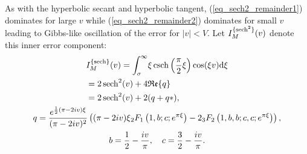 As with the hyperbolic secant and hyperbolic tangent, (\ref{eq_sech2_remainder1})
dominates for large $v$ while (\ref{eq_sech2_remainder2})
dominates for small $v$ leading to Gibbs-like oscillation of the
error for $|v| < V$.  Let $I_M^{\{\operatorname{sech}^2\}}(v)$ denote this inner
error component:
\begin{gather}
	\begin{split}
		\label{eq_lerch_error_part_sech2}
		&I_M^{\{\operatorname{sech}\}}(v) = \int_\sigma^{\infty} \!
		\xi\operatorname{csch}\left(\frac{\pi}{2}\xi\right)
		\cos(\xi v) \mathrm{d}\xi \\
		&= 2 \operatorname{sech}^2(v) + 4\mathfrak{Re}\{q\} \\
		&= 2 \operatorname{sech}^2(v) + 2(q + q*),
	\end{split}
    \\
    \begin{split}
    	q = \frac{e^{\frac{1}{2}(\pi-2iv)\xi}}{(\pi - 2iv)^2}
    	    \left(
    	        (\pi-2iv)\xi {}_{2}F_{1}\left(
    	                1, b; c; e^{\pi\xi}
    	        \right)
    	        - 2 {}_{3}F_{2}\left(
    	                1, b, b; c, c; e^{\pi\xi}
    	        \right)
    	    \right), \\
    \end{split}
    \\
    \begin{split}
    	b = \frac{1}{2}-\frac{iv}{\pi},\quad c = \frac{3}{2} - \frac{iv}{\pi}.
    \end{split}
\end{gather}

